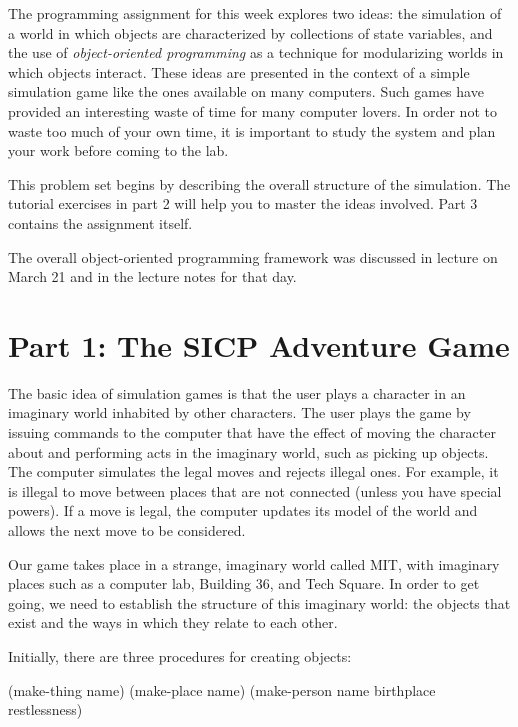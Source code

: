 




\medskip


The programming assignment for this week explores two ideas: the
simulation of a world in which objects are characterized by
collections of state variables, and the use of {\em object-oriented
programming} as a technique for modularizing worlds in which objects
interact.  These ideas are presented in the context of a simple
simulation game like the ones available on many computers.  Such games
have provided an interesting waste of time for many computer lovers.
In order not to waste too much of your own time, it is important to
study the system and plan your work before coming to the lab.

This problem set begins by describing the overall structure of the
simulation.  The tutorial exercises in part 2 will help you to master
the ideas involved.  Part 3 contains the assignment itself.

The overall object-oriented programming framework was discussed in
lecture on March 21 and in the lecture notes for that day.

\section{Part 1: The SICP Adventure Game}

The basic idea of simulation games is that the user plays a character
in an imaginary world inhabited by other characters. The user plays
the game by issuing commands to the computer that have the effect of
moving the character about and performing acts in the imaginary world,
such as picking up objects.  The computer simulates the legal moves
and rejects illegal ones.  For example, it is illegal to move between
places that are not connected (unless you have special powers).  If a
move is legal, the computer updates its model of the world and allows
the next move to be considered.

Our game takes place in a strange, imaginary world called MIT, with
imaginary places such as a computer lab, Building 36, and Tech Square.
In order to get going, we need to establish the structure of this
imaginary world: the objects that exist and the ways in which they
relate to each other.

Initially, there are three procedures for creating objects:

\beginlisp
  (make-thing  name)
  (make-place  name)
  (make-person name birthplace restlessness)
\endlisp

